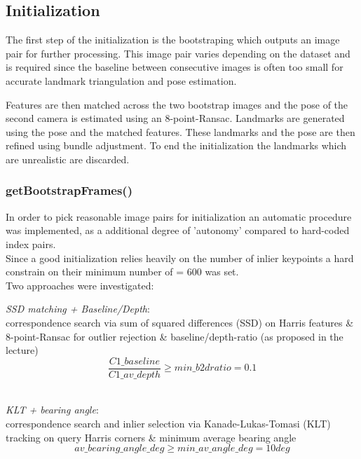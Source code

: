 \subsection{Initialization}
\label{sec_init}
The first step of the initialization is the bootstraping which outputs an image pair for further processing. This image pair varies depending on the dataset and is required since the baseline between consecutive images is often too small for accurate landmark triangulation and pose estimation.

Features are then matched across the two bootstrap images and the pose of the second camera is estimated using an 8-point-Ransac.
Landmarks are generated using the pose and the matched features. These landmarks and the pose are then refined using bundle adjustment. To end the initialization the landmarks which are unrealistic are discarded.

\subsubsection{getBootstrapFrames()}
\label{sec_boot}
In order to pick reasonable image pairs for initialization an automatic procedure was implemented, as a additional degree of 'autonomy' compared to hard-coded index pairs.\\
Since a good initialization relies heavily on the number of inlier keypoints a hard constrain on their minimum number of  = $600$ was set.\\

Two approaches were investigated:
\begin{compactitem}
	\item \textit{SSD matching + Baseline/Depth}:\\
	correspondence search via sum of squared differences (SSD) on Harris features \& 8-point-Ransac for outlier rejection \& baseline/depth-ratio (as proposed in the lecture)\\
	\begin{equation}
		\frac{C1\_baseline}{C1\_av\_depth} \geqslant min\_b2dratio = 0.1
	\end{equation}\\
	
	\item \textit{KLT + bearing angle}:\\
	correspondence search and inlier selection via Kanade-Lukas-Tomasi (KLT) tracking on query Harris corners \& minimum average bearing angle\\
	\begin{equation}
		av\_bearing\_angle\_deg \geqslant min\_av\_angle\_deg = 10 deg
	\end{equation}
\end{compactitem}

